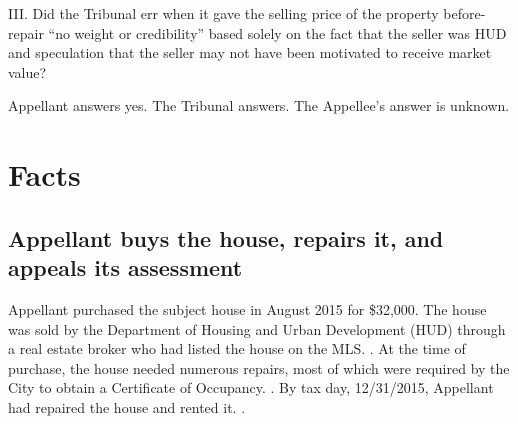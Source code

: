 \documentclass[12pt,\documentclassflag]{michiganCourtOfAppealsBrief}
\begin{document}
\noindent III. Did the Tribunal err when it gave the selling price of the property before-repair ``no weight or credibility'' based solely on the fact that the seller was HUD and speculation that the seller may not have been motivated to receive market value?

Appellant answers yes. The Tribunal answers. The Appellee's answer is unknown. 








 
\newpage

\section{Facts}
\label{facts}
\subsection{Appellant buys the house, repairs it, and appeals its assessment}

Appellant purchased the subject house in August 2015 for \$32,000. The house was sold by the Department of Housing and Urban Development (HUD) through a real estate broker who had listed the house on the MLS. \mlsListing[]. At the time of purchase, the house needed numerous repairs, most of which were required by the City to obtain a Certificate of Occupancy. \repairs[]. By tax day, 12/31/2015, Appellant had repaired the house and rented it. \foj[4-5].
\end{document}

